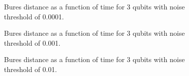 %
%
%
%
%
%

\begin{figure}[h]
\begin{center}
\end{center}
\caption{Bures distance as a function of time for 3 qubits with noise
threshold of 0.0001. }
\end{figure}

\pagebreak

\begin{figure}[h]
\begin{center}
\end{center}
\caption{Bures distance as a function of time for 3 qubits with noise
threshold of 0.001. }
\end{figure}

\pagebreak

\begin{figure}[h]
\begin{center}
\end{center}
\caption{Bures distance as a function of time for 3 qubits with noise
threshold of 0.01. }
\end{figure}

